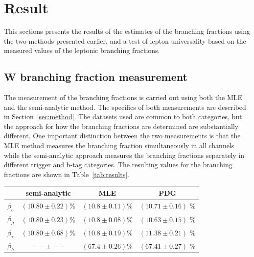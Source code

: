 \section{Result}
\label{sec:analysis:result}



This sections presents the results of the estimates of the branching
fractions using the two methods presented earlier, and a test of lepton
universality based on the measured values of the leptonic branching
fractions.

\subsection{W branching fraction measurement}

The measurement of the branching fractions is carried out using both the
MLE and the semi-analytic method.  The specifics of both measurements
are described in Section~\ref{sec:method}.  The datasets used are common
to both categories, but the approach for how the branching fractions are
determined are substantially different.  One important distinction
between the two measurements is that the MLE method measures the
branching fraction simultaneously in all channels while the
semi-analytic approach measures the branching fractions separately in
different trigger and b-tag categories.  The resulting values for the
\PW branching fractions are shown in
Table~\ref{tab:results}.

\begin{table}[h]
    \centering
    \begin{tabular}{l|c|c|c}
                   & semi-analytic          & MLE                   & PDG                  \\
    \hline                                                                 
    $\beta_{e}$    & $ (10.80 \pm 0.22) \%$ & $(10.8 \pm 0.11) \%$ & $(10.71 \pm 0.16)$ \% \\
    $\beta_{\mu}$  & $ (10.80 \pm 0.23) \%$ & $(10.8 \pm 0.08) \%$ & $(10.63 \pm 0.15)$ \% \\
    $\beta_{\tau}$ & $ (10.80 \pm 0.68) \%$ & $(10.8 \pm 0.19) \%$ & $(11.38 \pm 0.21)$ \% \\
    $\beta_{h}$    & $-- \pm --$            & $(67.4 \pm 0.26) \%$ & $(67.41 \pm 0.27)$ \% \\
    \end{tabular}
\end{table}


